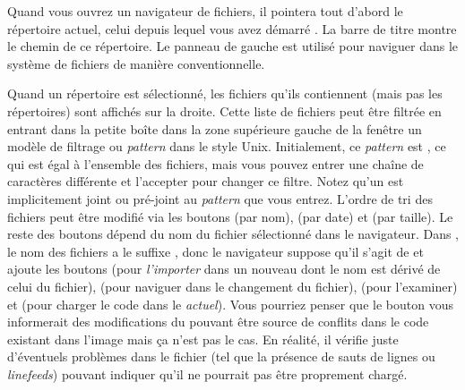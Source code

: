 \documentclass[a4paper,10pt,twoside]{book}
\begin{document}
Quand vous ouvrez un navigateur de fichiers, il pointera tout d'abord le répertoire
actuel, \ie celui depuis lequel vous avez démarré \pharo. La barre de titre
montre le chemin de ce répertoire.
Le panneau de gauche est utilisé pour naviguer dans le système de fichiers de manière
conventionnelle.

Quand un répertoire est sélectionné, les fichiers qu'ils contiennent (mais pas les répertoires) 
sont affichés sur la droite. Cette liste de fichiers peut être filtrée en entrant dans la petite boîte
dans la zone supérieure gauche de la fenêtre un modèle de filtrage ou 
\emph{pattern} dans le style Unix.
Initialement, ce \emph{pattern} est \ct{*}, ce qui est égal à l'ensemble des fichiers, mais vous 
pouvez entrer une chaîne de caractères différente et l'accepter pour changer ce filtre. 
Notez qu'un \ct{*} est implicitement joint ou pré-joint au \emph{pattern}
que vous entrez.
L'ordre de tri des fichiers peut être modifié via les boutons  (par nom), 
 (par date) et  (par taille).
Le reste des boutons dépend du nom du fichier sélectionné dans le navigateur.
Dans , le nom des fichiers a le suffixe , donc le navigateur
suppose qu'il s'agit de \changeset et ajoute les boutons  (pour
\textit{l'importer} dans un nouveau \changeset dont le nom est dérivé
de celui du fichier),  (pour naviguer dans le changement du fichier),
 (pour l'examiner) et  (pour charger
le code dans le \changeset \emph{actuel}).
Vous pourriez penser que le bouton  vous informerait 
des modifications du \changeset pouvant être source de conflits dans le code existant
dans l'image mais ça n'est pas le cas.
En réalité, il vérifie juste d'éventuels problèmes dans le fichier (tel que
la présence de sauts de lignes ou \textit{linefeeds})
pouvant indiquer qu'il ne pourrait pas être proprement chargé.
\end{document}
